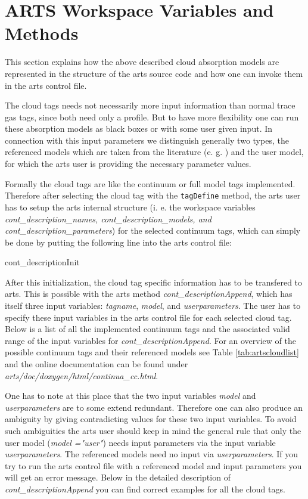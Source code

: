 \section{ARTS Workspace Variables and Methods}
\label{levelb:ArtsImplementationCloudAbsorption}

This section explains how the above described cloud absorption models
are represented in the structure of the arts source code and how 
one can invoke them in the arts control file.

The cloud tags needs not necessarily more input information than 
normal trace gas tags, since both need only a profile. But to have 
more flexibility one can run these absorption models as black boxes 
or with some user given input. In connection with this input parameters 
we distinguish generally two types, the referenced models which 
are taken from the literature (e. g. \citet{liebeetal:93}) and the 
user model, for which the arts user is providing the necessary 
parameter values.

Formally the cloud tags are like the 
continuum or full model tags implemented. Therefore after selecting 
the cloud tag with the {\tt tagDefine} method, the arts user has to 
setup the arts internal structure (i. e. the workspace variables 
{\it cont\_description\_names, cont\_description\_models, 
and cont\_description\_parameters}) for the selected continuum tags, 
which can simply be done by putting the following line into the 
arts control file:
\begin{code}
cont_descriptionInit{}
\end{code}

After this initialization, the cloud tag specific
information has to be transfered to arts. This is possible with the 
arts method {\it cont\_descriptionAppend}, which has itself 
three input variables: {\it tagname}, {\it model}, and 
{\it userparameters}. The user has to specify these input 
variables in the arts control file for each selected cloud tag. 
Below is a list of all the implemented continuum tags and the associated
valid range of the input variables for {\it cont\_descriptionAppend}. 
For an overview of the possible continuum tags and their 
referenced models see Table \ref{tab:artscloudlist} and the 
online documentation can be found under 
{\it arts/doc/doxygen/html/continua\_cc.html}.

One has to note at this place that the two input variables {\it model} and
{\it userparameters} are to some extend redundant. Therefore one can also 
produce an ambiguity by giving contradicting values for these two input variables.
To avoid such ambiguities the arts user should keep in mind the general 
rule that only the user model ({\it model ="user"}) needs input parameters 
via the input variable {\it userparameters}. The referenced models 
need no input via {\it userparameters}. If you try to run the arts control 
file with a referenced model and input parameters you will get an error message.
Below in the detailed description of {\it cont\_descriptionAppend} you 
can find correct examples for all the cloud tags.

